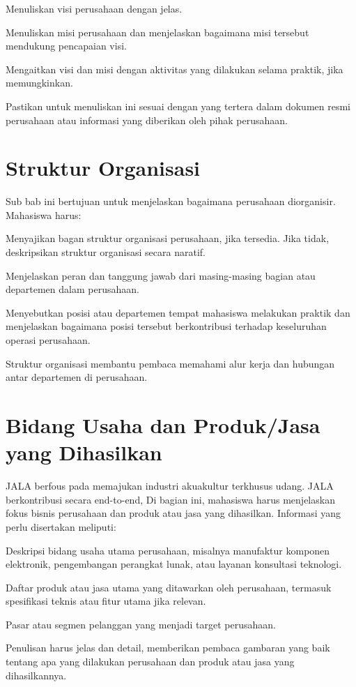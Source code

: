 \begin{packed_enum}
    \item Menuliskan visi perusahaan dengan jelas.
    \item Menuliskan misi perusahaan dan menjelaskan bagaimana misi tersebut mendukung pencapaian visi.
    \item Mengaitkan visi dan misi dengan aktivitas yang dilakukan selama praktik, jika memungkinkan.
\end{packed_enum}
Pastikan untuk menuliskan ini sesuai dengan yang tertera dalam dokumen resmi perusahaan atau informasi yang diberikan oleh pihak perusahaan.

\section{Struktur Organisasi}
Sub bab ini bertujuan untuk menjelaskan bagaimana perusahaan diorganisir. Mahasiswa harus:

\begin{packed_enum}
    \item Menyajikan bagan struktur organisasi perusahaan, jika tersedia. Jika tidak, deskripsikan struktur organisasi secara naratif.
    \item Menjelaskan peran dan tanggung jawab dari masing-masing bagian atau departemen dalam perusahaan.
    \item Menyebutkan posisi atau departemen tempat mahasiswa melakukan praktik dan menjelaskan bagaimana posisi tersebut berkontribusi terhadap keseluruhan operasi perusahaan.
\end{packed_enum}

Struktur organisasi membantu pembaca memahami alur kerja dan hubungan antar departemen di perusahaan.

\section{Bidang Usaha dan Produk/Jasa yang Dihasilkan}
    JALA berfous pada memajukan industri akuakultur terkhusus udang. JALA berkontribusi secara end-to-end,  
Di bagian ini, mahasiswa harus menjelaskan fokus bisnis perusahaan dan produk atau jasa yang dihasilkan. Informasi yang perlu disertakan meliputi:

\begin{packed_enum}
    \item Deskripsi bidang usaha utama perusahaan, misalnya manufaktur komponen elektronik, pengembangan perangkat lunak, atau layanan konsultasi teknologi.
    \item Daftar produk atau jasa utama yang ditawarkan oleh perusahaan, termasuk spesifikasi teknis atau fitur utama jika relevan.
    \item Pasar atau segmen pelanggan yang menjadi target perusahaan.
\end{packed_enum}

Penulisan harus jelas dan detail, memberikan pembaca gambaran yang baik tentang apa yang dilakukan perusahaan dan produk atau jasa yang dihasilkannya.